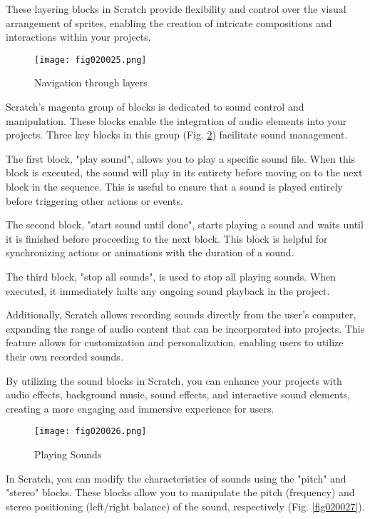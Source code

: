 These layering blocks in Scratch provide flexibility and control over the visual arrangement of sprites, enabling the creation of intricate compositions and interactions within your projects.

\begin{figure}[H]
   \centering
   \texttt{[image: fig020025.png]}
   \caption{Navigation through layers}
\label{fig020025}
\end{figure}

Scratch's magenta group of blocks is dedicated to sound control and manipulation. These blocks enable the integration of audio elements into your projects. Three key blocks in this group (Fig. \ref{fig020026}) facilitate sound management.

The first block, "play sound", allows you to play a specific sound file. When this block is executed, the sound will play in its entirety before moving on to the next block in the sequence. This is useful to ensure that a sound is played entirely before triggering other actions or events.

The second block, "start sound until done", starts playing a sound and waits until it is finished before proceeding to the next block. This block is helpful for synchronizing actions or animations with the duration of a sound.

The third block, "stop all sounds", is used to stop all playing sounds. When executed, it immediately halts any ongoing sound playback in the project.

Additionally, Scratch allows recording sounds directly from the user's computer, expanding the range of audio content that can be incorporated into projects. This feature allows for customization and personalization, enabling users to utilize their own recorded sounds.

By utilizing the sound blocks in Scratch, you can enhance your projects with audio effects, background music, sound effects, and interactive sound elements, creating a more engaging and immersive experience for users.

\begin{figure}[H]
   \centering
   \texttt{[image: fig020026.png]}
   \caption{Playing Sounds}
\label{fig020026}
\end{figure}

In Scratch, you can modify the characteristics of sounds using the "pitch" and "stereo" blocks. These blocks allow you to manipulate the pitch (frequency) and stereo positioning (left/right balance) of the sound, respectively (Fig. \ref{fig020027}).

